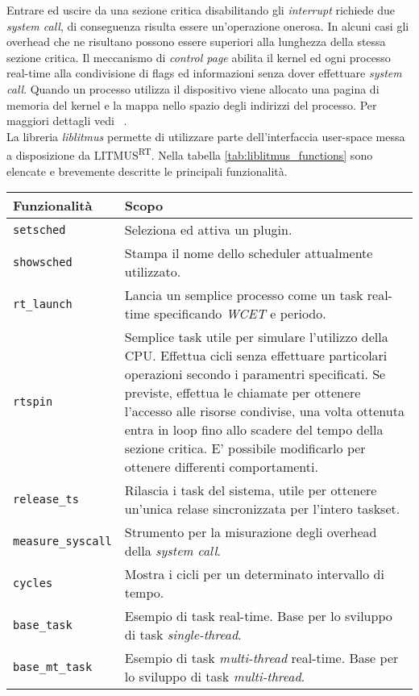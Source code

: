 \begin{appendices}
\noindent Entrare ed uscire da una sezione critica disabilitando gli \textit{interrupt} richiede due \textit{system call}, di conseguenza risulta essere un'operazione onerosa. In alcuni casi gli overhead che ne risultano possono essere superiori alla lunghezza della stessa sezione critica. Il meccanismo di \textit{control page} abilita il kernel ed ogni processo real-time alla condivisione di flags ed informazioni senza dover effettuare \textit{system call}. Quando un processo utilizza il dispositivo viene allocato una pagina di memoria del kernel e la mappa nello spazio degli indirizzi del processo. Per maggiori dettagli vedi ~\cite{BBBThesis}.\\

\noindent La libreria \textit{liblitmus} permette di utilizzare parte dell'interfaccia user-space messa a disposizione da LITMUS\textsuperscript{RT}. Nella tabella \ref{tab:liblitmus_functions} sono elencate e brevemente descritte le principali funzionalità.\\

\begin{table}
  \centering
  \begin{tabular}{|l p{10cm}|}
	\hline
	    Funzionalità & Scopo \\
	\hline \hline
	   
\texttt{setsched}			& Seleziona ed attiva un plugin. \\
\texttt{showsched}			& Stampa il nome dello scheduler attualmente utilizzato. \\
\texttt{rt\_launch}			& Lancia un semplice processo come un task real-time specificando \textit{WCET} e periodo. \\
\texttt{rtspin}				& Semplice task utile per simulare l'utilizzo della CPU. Effettua cicli senza effettuare particolari operazioni secondo i paramentri specificati. Se previste, effettua le chiamate per ottenere l'accesso alle risorse condivise, una volta ottenuta entra in loop fino allo scadere del tempo della sezione critica. E' possibile modificarlo per ottenere differenti comportamenti. \\
\texttt{release\_ts}		& Rilascia i task del sistema, utile per ottenere un'unica relase sincronizzata per l'intero taskset.\\
\texttt{measure\_syscall}	& Strumento per la misurazione degli overhead della \textit{system call}.\\
\texttt{cycles}				& Mostra i cicli per un determinato intervallo di tempo. \\
\texttt{base\_task}			& Esempio di task real-time. Base per lo sviluppo di task \textit{single-thread}. \\
\texttt{base\_mt\_task}		& Esempio di task \textit{multi-thread} real-time. Base per lo sviluppo di task \textit{multi-thread}. \\


\end{tabular}
\end{table}
\end{appendices}
